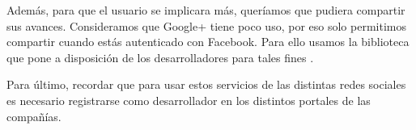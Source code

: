 \vspace{1em}
Además, para que el usuario se implicara más, queríamos que pudiera compartir sus avances. Consideramos que Google+ tiene poco uso, por eso solo permitimos compartir cuando estás autenticado con Facebook. Para ello usamos la biblioteca que pone a disposición de los desarrolladores para tales fines \cite{libreriaFacebook}.

\vspace{1em}
Para último, recordar que para usar estos servicios de las distintas redes sociales es necesario registrarse como desarrollador en los distintos portales de las compañías.
